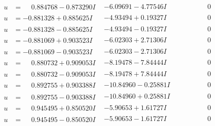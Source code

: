 \documentclass[1p]{elsarticle_modified}
\theoremstyle{definition}
\begin{document}
$$\begin{array}{c|c|c}
 \hline 
\begin{aligned}
u &= \phantom{-}0.884768 - 0.873290 I\end{aligned}
 & -6.09691 - 4.77546 I & \phantom{-0.000000 } 0 \\ \hline\begin{aligned}
u &= -0.881328 + 0.885625 I\end{aligned}
 & -4.93494 + 0.19327 I & \phantom{-0.000000 } 0 \\ \hline\begin{aligned}
u &= -0.881328 - 0.885625 I\end{aligned}
 & -4.93494 - 0.19327 I & \phantom{-0.000000 } 0 \\ \hline\begin{aligned}
u &= -0.881069 + 0.903523 I\end{aligned}
 & -6.02303 + 2.71306 I & \phantom{-0.000000 } 0 \\ \hline\begin{aligned}
u &= -0.881069 - 0.903523 I\end{aligned}
 & -6.02303 - 2.71306 I & \phantom{-0.000000 } 0 \\ \hline\begin{aligned}
u &= \phantom{-}0.880732 + 0.909053 I\end{aligned}
 & -8.19478 - 7.84444 I & \phantom{-0.000000 } 0 \\ \hline\begin{aligned}
u &= \phantom{-}0.880732 - 0.909053 I\end{aligned}
 & -8.19478 + 7.84444 I & \phantom{-0.000000 } 0 \\ \hline\begin{aligned}
u &= \phantom{-}0.892755 + 0.903388 I\end{aligned}
 & -10.84960 - 0.25881 I & \phantom{-0.000000 } 0 \\ \hline\begin{aligned}
u &= \phantom{-}0.892755 - 0.903388 I\end{aligned}
 & -10.84960 + 0.25881 I & \phantom{-0.000000 } 0 \\ \hline\begin{aligned}
u &= \phantom{-}0.945495 + 0.850520 I\end{aligned}
 & -5.90653 + 1.61727 I & \phantom{-0.000000 } 0 \\ \hline\begin{aligned}
u &= \phantom{-}0.945495 - 0.850520 I\end{aligned}
 & -5.90653 - 1.61727 I & \phantom{-0.000000 } 0 \\ \hline\begin{aligned}

\end{aligned}
\end{array}$$
\end{document}
